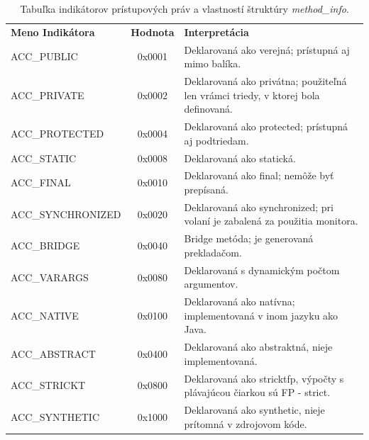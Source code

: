 \documentclass[11pt,final,oneside]{fithesis}
\newenvironment{example}[1]
{
\vspace{3mm}
\noindent\textbf{#1}
\vspace{2mm}
}
{
\vspace{3mm}
}
\begin{document}
\begin{table}
  \begin{tabular}{| l | c | p{} |}
    \hline
    \textbf{Meno Indikátora} & \textbf{Hodnota} & \textbf{Interpretácia} \\
    \hhline{|=|=|=|}
    ACC\_PUBLIC & 0x0001 & Deklarovaná ako verejná; prístupná aj mimo balíka.
    \\ \hline
    ACC\_PRIVATE & 0x0002 & Deklarovaná ako privátna; použiteľná len vrámci 
    triedy, v ktorej bola definovaná. \\ \hline
    ACC\_PROTECTED & 0x0004 & Deklarovaná ako protected; prístupná aj 
    podtriedam. \\ \hline
    ACC\_STATIC & 0x0008 & Deklarovaná ako statická. \\ \hline
    ACC\_FINAL & 0x0010 & Deklarovaná ako final; nemôže byť prepísaná.
    \\ \hline
    ACC\_SYNCHRONIZED & 0x0020 & Deklarovaná ako synchronized; pri volaní je
    zabalená za použitia monitora. \\ \hline
    ACC\_BRIDGE & 0x0040 & Bridge metóda; je generovaná prekladačom. \\ \hline
    ACC\_VARARGS & 0x0080 & Deklarovaná s dynamickým počtom argumentov.
    \\ \hline
    ACC\_NATIVE & 0x0100 & Deklarovaná ako natívna; implementovaná v inom
    jazyku ako Java. \\ \hline
    ACC\_ABSTRACT & 0x0400 & Deklarovaná ako abstraktná, nieje implementovaná.
    \\ \hline
    ACC\_STRICKT & 0x0800 & Deklarovaná ako stricktfp, výpočty s plávajúcou
    čiarkou sú FP - strict. \\ \hline
    ACC\_SYNTHETIC & 0x1000 & Deklarovaná ako synthetic, nieje prítomná v
    zdrojovom kóde. \\
    \hline
  \end{tabular}
  \caption{Tabuľka indikátorov prístupových práv a vlastností štruktúry
  \textit {method\_info}.}
  \label{tab:tab5}
\end{table}

%
%
\end{document}
